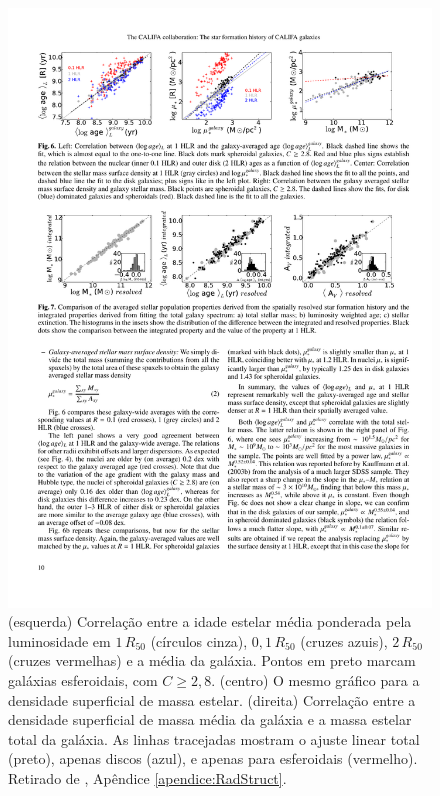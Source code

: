 \begin{figure}
	\includegraphics[width=1.0\columnwidth]{figuras/radstruct-01}
	\caption[Correlação entre idade, desidade superficial e massa estelar total]
	{(esquerda) Correlação entre a idade estelar média ponderada pela luminosidade
	em $1\,R_{50}$ (círculos cinza), $0,1\,R_{50}$ (cruzes azuis), $2\,R_{50}$
	(cruzes vermelhas) e a média da galáxia. Pontos em preto marcam galáxias
	esferoidais, com $C \geq 2,8$. (centro) O mesmo gráfico para a densidade
	superficial de massa estelar. (direita) Correlação entre a densidade
	superficial de massa média da galáxia e a massa estelar total da galáxia. As
	linhas tracejadas mostram o ajuste linear total (preto), apenas discos (azul),
	e apenas para esferoidais (vermelho).  Retirado de \cite[figura
	6]{GonzalezDelgado2014a}, Apêndice \ref{apendice:RadStruct}.}
	\label{fig:radStruct1}
\end{figure}

